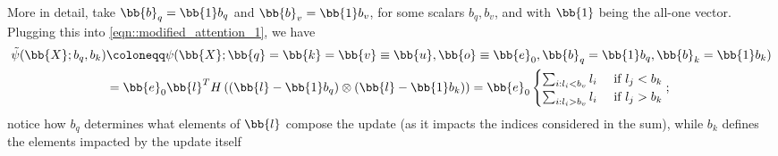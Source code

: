 More in detail, take $\bb{b}_q=\bb{1}b_q$ and $\bb{b}_v=\bb{1}b_v$, for some scalars $b_q,b_v$, and with $\bb{1}$ being the all-one vector. Plugging this into \cref{eqn::modified_attention_1}, we have
\begin{equation}
\begin{split}
    \tilde{\psi}(\bb{X};b_q,b_k) &\coloneqq \psi(\bb{X};\bb{q}=\bb{k}=\bb{v}\equiv\bb{u},\bb{o}\equiv\bb{e}_0,\bb{b}_q=\bb{1}b_q,\bb{b}_k=\bb{1}b_k)\\
    &= \bb{e}_0\bb{l}^T H\left(\left(\bb{l}-\bb{1}b_q\right)\otimes\left(\bb{l}-\bb{1}b_k\right)\right)
    =\bb{e}_0\begin{cases}
        \sum_{i:l_i<b_v} l_i &\text{ if } l_j < b_k \\
        \sum_{i:l_i>b_v} l_i &\text{ if } l_j > b_k
    \end{cases};
    \label{eqn::modified_attention_2}
\end{split}
\end{equation}
notice how $b_q$ determines what elements of $\bb{l}$ compose the update (as it impacts the indices considered in the sum), while $b_k$ defines the elements impacted by the update itself
